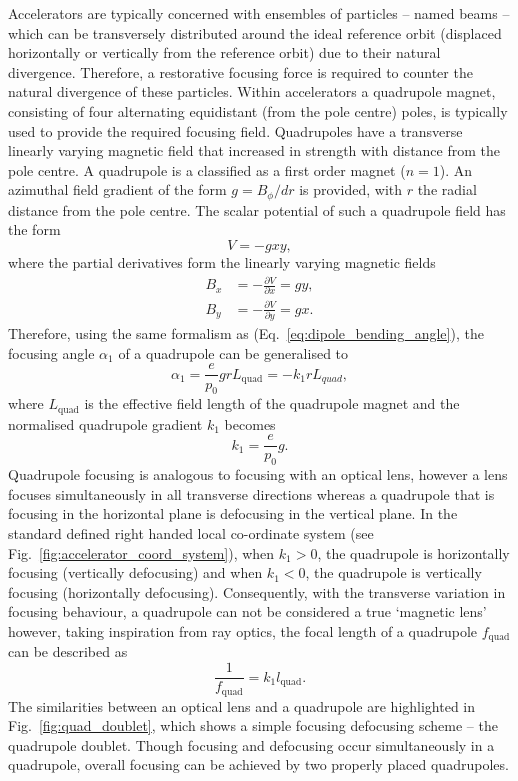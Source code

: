 \documentclass[../main.tex]{subfiles}
\begin{document}
Accelerators are typically concerned with ensembles of particles -- named beams -- which can be transversely distributed around the ideal reference orbit (displaced horizontally or vertically from the reference orbit) due to their natural divergence. Therefore, a restorative focusing force is required to counter the natural divergence of these particles. Within accelerators a quadrupole magnet, consisting of four alternating equidistant (from the pole centre) poles, is typically used to provide the required focusing field. Quadrupoles have a transverse linearly varying magnetic field that increased in strength with distance from the pole centre. A quadrupole is a classified as a first order magnet ($n=1$). An azimuthal field gradient of the form $g = B_{\phi}/dr$ is provided, with $r$ the radial distance from the pole centre. The scalar potential of such a quadrupole field has the form
\begin{equation}
V = -gxy,
\label{eq:quadrupole_potential}    
\end{equation}
where the partial derivatives form the linearly varying magnetic fields
\begin{align}
B_{x} &= -\frac{\partial V}{\partial x} = gy, \nonumber\\
B_{y} &= -\frac{\partial V}{\partial y} = gx.
\end{align}
Therefore, using the same formalism as (Eq.~\ref{eq:dipole_bending_angle}), the focusing angle $\alpha_{1}$ of a quadrupole can be generalised to
\begin{equation}
\alpha_{1} = \frac{e}{p_{0}}grL_{\mathrm{quad}} = -k_{1}rL_{quad},
\label{eq:quadrupole_focusing_angle}    
\end{equation}
where $L_{\mathrm{quad}}$ is the effective field length of the quadrupole magnet and the normalised quadrupole gradient $k_{1}$ becomes
\begin{equation}
k_{1} = \frac{e}{p_{0}}g.
\label{eq:quadrupole_normalised_gradient}
\end{equation}
Quadrupole focusing is analogous to focusing with an optical lens, however a lens focuses simultaneously in all transverse directions whereas a quadrupole that is focusing in the horizontal plane is defocusing in the vertical plane. In the standard defined right handed local co-ordinate system (see Fig.~\ref{fig:accelerator_coord_system}), when $k_{1} > 0$, the quadrupole is horizontally focusing (vertically defocusing) and when $k_{1} < 0$, the quadrupole is vertically focusing (horizontally defocusing). Consequently, with the transverse variation in focusing behaviour, a quadrupole can not be considered a true `magnetic lens' however, taking inspiration from ray optics, the focal length of a quadrupole $f_{\mathrm{quad}}$ can be described as
\begin{equation}
\frac{1}{f_{\mathrm{quad}}} = k_{1}l_{\mathrm{quad}}.
\label{eq:focal_length_quadrupole}    
\end{equation}
The similarities between an optical lens and a quadrupole are highlighted in Fig.~\ref{fig:quad_doublet}, which shows a simple focusing defocusing scheme -- the quadrupole doublet. Though focusing and defocusing occur simultaneously in a quadrupole, overall focusing can be achieved by two properly placed quadrupoles.  
\end{document}
